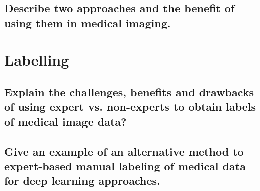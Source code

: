 \subsection{Describe two approaches and the benefit of using them in medical imaging.}

\section{Labelling}
\subsection{Explain the challenges, benefits and drawbacks of using expert vs. non-experts to obtain labels of medical image data?}
\subsection{Give  an example of an alternative method to expert-based manual labeling of medical data for deep learning approaches.}


\addtocounter{section}{-1}\section{}\label{sec:todo}